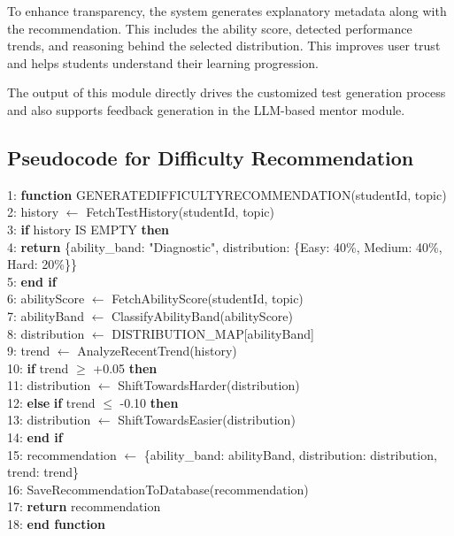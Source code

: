 \begin{sloppypar}
To enhance transparency, the system generates explanatory metadata along with the recommendation. This includes the ability score, detected performance trends, and reasoning behind the selected distribution. This improves user trust and helps students understand their learning progression.

The output of this module directly drives the customized test generation process and also supports feedback generation in the LLM-based mentor module.

\subsection{Pseudocode for Difficulty Recommendation}

1: \textbf{function} GENERATEDIFFICULTYRECOMMENDATION(studentId, topic)\\
2: \quad history $\leftarrow$ FetchTestHistory(studentId, topic)\\
3: \quad \textbf{if} history IS EMPTY \textbf{then}\\
4: \qquad \textbf{return} \{ability\_band: "Diagnostic", distribution: \{Easy: 40\%, Medium: 40\%, Hard: 20\%\}\}\\
5: \quad \textbf{end if}\\
6: \quad abilityScore $\leftarrow$ FetchAbilityScore(studentId, topic)\\
7: \quad abilityBand $\leftarrow$ ClassifyAbilityBand(abilityScore)\\
8: \quad distribution $\leftarrow$ DISTRIBUTION\_MAP[abilityBand]\\
9: \quad trend $\leftarrow$ AnalyzeRecentTrend(history)\\
10: \quad \textbf{if} trend $\geq$ +0.05 \textbf{then}\\
11: \qquad distribution $\leftarrow$ ShiftTowardsHarder(distribution)\\
12: \quad \textbf{else} \textbf{if} trend $\leq$ -0.10 \textbf{then}\\
13: \qquad distribution $\leftarrow$ ShiftTowardsEasier(distribution)\\
14: \quad \textbf{end if}\\
15: \quad recommendation $\leftarrow$ \{ability\_band: abilityBand, distribution: distribution, trend: trend\}\\
16: \quad SaveRecommendationToDatabase(recommendation)\\
17: \quad \textbf{return} recommendation\\
18: \textbf{end function}
\algofooter


\end{sloppypar}
